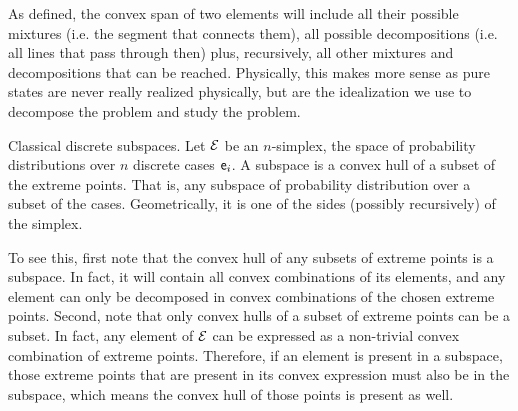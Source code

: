 \begin{remark}
	As defined, the convex span of two elements will include all their possible mixtures (i.e. the segment that connects them), all possible decompositions (i.e. all lines that pass through then) plus, recursively, all other mixtures and decompositions that can be reached. Physically, this makes more sense as pure states are never really realized physically, but are the idealization we use to decompose the problem and study the problem.
\end{remark}

\begin{example} Classical discrete subspaces.
	Let $\mathcal{E}$ be an $n$-simplex, the space of probability distributions over $n$ discrete cases $\mathsf{e}_i$. A subspace is a convex hull of a subset of the extreme points. That is, any subspace of probability distribution over a subset of the cases. Geometrically, it is one of the sides (possibly recursively) of the simplex.
	
	To see this, first note that the convex hull of any subsets of extreme points is a subspace. In fact, it will contain all convex combinations of its elements, and any element can only be decomposed in convex combinations of the chosen extreme points. Second, note that only convex hulls of a subset of extreme points can be a subset. In fact, any element of $\mathcal{E}$ can be expressed as a non-trivial convex combination of extreme points. Therefore, if an element is present in a subspace, those extreme points that are present in its convex expression must also be in the subspace, which means the convex hull of those points is present as well.
\end{example}

